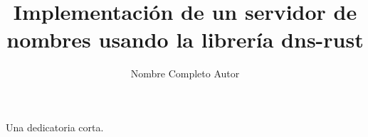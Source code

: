 \documentclass{umemoria}
\author{Nombre Completo Autor}
\title{Implementación de un servidor de nombres usando la librería dns-rust}
\begin{document}
\frontmatter
\maketitle

\begin{resumen}
\lipsum[1-4]
\end{resumen}


\begin{dedicatoria}
Una dedicatoria corta.
\end{dedicatoria}

\begin{thanks}
\lipsum[1-2]
\end{thanks}

\tableofcontents
\listoftables %
\listoffigures %

\mainmatter













\nocite{*}



\begin{appendices}

\end{appendices}
\end{document}
